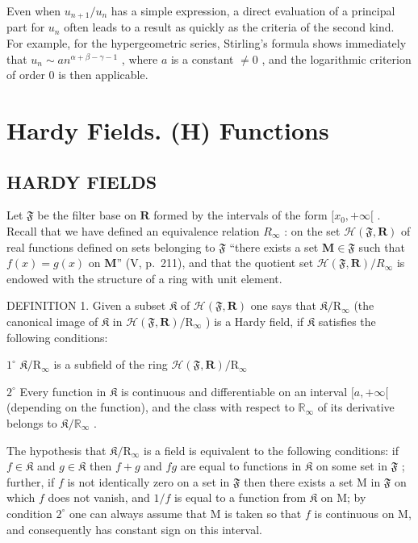 Even when \(u_{n+1} / u_n\) has a simple expression, a direct evaluation of a principal part for \(u_n\) often leads to a result as quickly as the criteria of the second kind. For example, for the hypergeometric series, Stirling's formula shows immediately that \(u_n \sim a n^{\alpha + \beta - \gamma - 1}\) , where \(a\) is a constant \(\neq 0\) , and the logarithmic criterion of order 0 is then applicable.

\appendix
\renewcommand{\thechapter}{}
\renewcommand{\thesection}{\arabic{section}}
\chapter{Hardy Fields. (H) Functions}

\section{HARDY FIELDS}

Let \(\mathfrak{F}\) be the filter base on \(\mathbf{R}\) formed by the intervals of the form \([x_0, +\infty[\) . Recall that we have defined an equivalence relation \(R_{\infty}\) : on the set \(\mathcal{H}(\mathfrak{F}, \mathbf{R})\) of real functions defined on sets belonging to \(\mathfrak{F}\) ``there exists a set \(\mathbf{M} \in \mathfrak{F}\) such that \(f(x) = g(x)\) on \(\mathbf{M}\)'' (V, p.~211), and that the quotient set \(\mathcal{H}(\mathfrak{F}, \mathbf{R}) / R_{\infty}\) is endowed with the structure of a ring with unit element.

DEFINITION 1. Given a subset \(\mathfrak{K}\) of \(\mathcal{H}(\mathfrak{F},\mathbf{R})\) one says that \(\mathfrak{K}/\mathrm{R}_{\infty}\) (the canonical image of \(\mathfrak{K}\) in \(\mathcal{H}(\mathfrak{F},\mathbf{R})/\mathrm{R}_{\infty}\) ) is a Hardy field, if \(\mathfrak{K}\) satisfies the following conditions:

\(1^{\circ}\) \(\mathfrak{K} / \mathrm{R}_{\infty}\) is a subfield of the ring \(\mathcal{H}(\mathfrak{F},\mathbf{R}) / \mathrm{R}_{\infty}\)

\(2^{\circ}\) Every function in \(\mathfrak{K}\) is continuous and differentiable on an interval \([a, +\infty[\) (depending on the function), and the class with respect to \(\mathbb{R}_{\infty}\) of its derivative belongs to \(\mathfrak{K}/\mathbb{R}_{\infty}\) .

The hypothesis that \(\mathfrak{K} / \mathrm{R}_{\infty}\) is a field is equivalent to the following conditions: if \(f\in \mathfrak{K}\) and \(g\in \mathfrak{K}\) then \(f + g\) and \(fg\) are equal to functions in \(\mathfrak{K}\) on some set in \(\mathfrak{F}\) ; further, if \(f\) is not identically zero on a set in \(\mathfrak{F}\) then there exists a set M in \(\mathfrak{F}\) on which \(f\) does not vanish, and \(1 / f\) is equal to a function from \(\mathfrak{K}\) on M; by condition \(2^{\circ}\) one can always assume that M is taken so that \(f\) is continuous on M, and consequently has constant sign on this interval.

